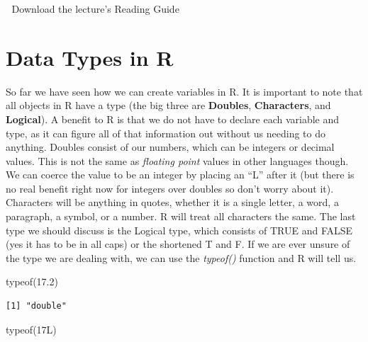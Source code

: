 \documentclass[
  letterpaper,
  DIV=11,
  numbers=noendperiod]{scrreprt}
\newenvironment{Shaded}{\begin{snugshade}}{\end{snugshade}}
\newcommand{\DecValTok}[1]{\textcolor[rgb]{0.68,0.00,0.00}{#1}}
\newcommand{\FloatTok}[1]{\textcolor[rgb]{0.68,0.00,0.00}{#1}}
\newcommand{\FunctionTok}[1]{\textcolor[rgb]{0.28,0.35,0.67}{#1}}
\newcommand{\NormalTok}[1]{\textcolor[rgb]{0.00,0.23,0.31}{#1}}
\begin{document}
\begin{tcolorbox}[enhanced jigsaw, colframe=quarto-callout-tip-color-frame, colback=white, breakable, rightrule=.15mm, title=\textcolor{quarto-callout-tip-color}{\faLightbulb}\hspace{0.5em}{Supplemental Material}, bottomtitle=1mm, toptitle=1mm, titlerule=0mm, left=2mm, coltitle=black, colbacktitle=quarto-callout-tip-color!10!white, leftrule=.75mm, opacitybacktitle=0.6, bottomrule=.15mm, opacityback=0, arc=.35mm, toprule=.15mm]

📄 Download the lecture's Reading Guide

\end{tcolorbox}

\section{Data Types in R}\label{data-types-in-r}

So far we have seen how we can create variables in R. It is important to
note that all objects in R have a type (the big three are
\textbf{Doubles}, \textbf{Characters}, and \textbf{Logical}). A benefit
to R is that we do not have to declare each variable and type, as it can
figure all of that information out without us needing to do anything.
Doubles consist of our numbers, which can be integers or decimal values.
This is not the same as \emph{floating point} values in other languages
though. We can coerce the value to be an integer by placing an ``L''
after it (but there is no real benefit right now for integers over
doubles so don't worry about it). Characters will be anything in quotes,
whether it is a single letter, a word, a paragraph, a symbol, or a
number. R will treat all characters the same. The last type we should
discuss is the Logical type, which consists of TRUE and FALSE (yes it
has to be in all caps) or the shortened T and F. If we are ever unsure
of the type we are dealing with, we can use the \emph{typeof()} function
and R will tell us.

\begin{Shaded}
\begin{Highlighting}[]
\FunctionTok{typeof}\NormalTok{(}\FloatTok{17.2}\NormalTok{)}
\end{Highlighting}
\end{Shaded}

\begin{verbatim}
[1] "double"
\end{verbatim}

\begin{Shaded}
\begin{Highlighting}[]
\FunctionTok{typeof}\NormalTok{(}\DecValTok{17}\NormalTok{L)}
\end{Highlighting}
\end{Shaded}
\end{document}
